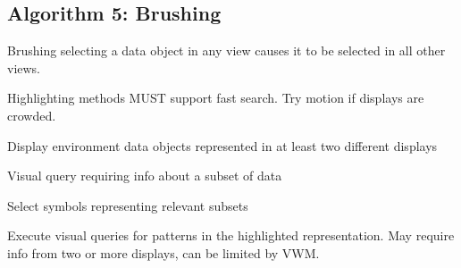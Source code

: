 \begin{mdframed}
\begin{multicols}{2}
\subsection{Algorithm 5: Brushing}
\begin{compactdesc}
\item[Brushing] selecting a data object in any view causes it to be
    selected in all other views.
\item[Highlighting] methods MUST support fast search. Try motion if displays
    are crowded.
\item[Display environment] data objects represented in at least two different
    displays
\end{compactdesc}


\midrule\begin{compactenum}
\item Visual query requiring info about a subset of data
\item Select symbols representing relevant subsets
\item Execute visual queries for patterns in the highlighted representation.
    May require info from two or more displays, can be limited by VWM.
\end{compactenum}

\end{multicols}\end{mdframed}





